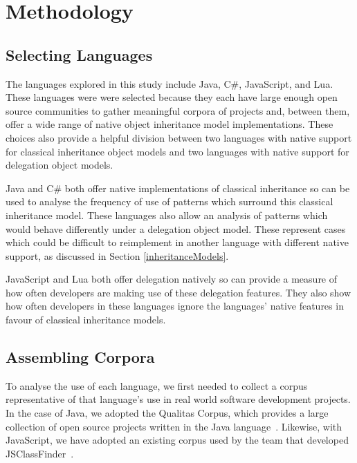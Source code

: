 \chapter{Methodology}\label{C:method} 

\section{Selecting Languages}
The languages explored in this study include Java, C\#, JavaScript, and Lua. These languages were were selected because they each have large enough open source communities to gather meaningful corpora of projects and, between them, offer a wide range of native object inheritance model implementations. These choices also provide a helpful division between two languages with native support for classical inheritance object models and two languages with native support for delegation object models.
\newline

Java and C\# both offer native implementations of classical inheritance so can be used to analyse the frequency of use of patterns which surround this classical inheritance model. These languages also allow an analysis of patterns which would behave differently under a delegation object model. These represent cases which could be difficult to reimplement in another language with different native support, as discussed in Section \ref{inheritanceModels}.
\newline

JavaScript and Lua both offer delegation natively so can provide a measure of how often developers are making use of these delegation features. They also show how often developers in these languages ignore the languages' native features in favour of classical inheritance models.

\section{Assembling Corpora}
To analyse the use of each language, we first needed to collect a corpus representative of that language's use in real world software development projects. In the case of Java, we adopted the Qualitas Corpus, which provides a large collection of open source projects written in the Java language~\cite{QualitasCorpus}. Likewise, with JavaScript, we have adopted an existing corpus used by the team that developed JSClassFinder~\cite{JSClassFinder}.
\newline

